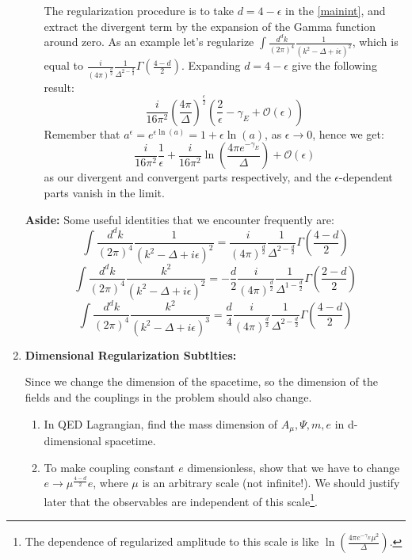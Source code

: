\documentclass[11pt]{article}
\begin{document}
\begin{enumerate}
\begin{problem}{\points{-}}
\begin{enumerate}
		The regularization procedure is to take $d = 4-\epsilon$ in the \eqref{mainint}, and extract the divergent term by the expansion of the Gamma function around zero. As an example let's regularize $\int \frac{d^dk}{(2\pi)^4} \frac{1}{(k^2-\Delta+i\epsilon)^2}$, which is equal to 
		$\frac{i}{(4\pi)^{\frac{d}{2}}} 
		\frac{1}{\Delta^{2-\frac{d}{2}}}\Gamma(\frac{4-d}{2}).
		$
		Expanding $d= 4 - \epsilon$ give the following result:
		\[
		\frac{i}{16\pi^2} (\frac{4\pi}{\Delta})^{\frac{\epsilon}{2}}(\frac{2}{\epsilon} - \gamma_E + \mathcal{O}(\epsilon))
		\]
		Remember that $a^\epsilon = e^{\epsilon \ln(a)} = 1+\epsilon \ln(a)$, as $\epsilon \to 0$, hence we get:
		\[
		\frac{i}{16\pi^2}\frac{1}{\epsilon} + 	\frac{i}{16\pi^2}\ln(\frac{4\pi e^{-\gamma_E}}{\Delta}) + \mathcal{O}(\epsilon)
		\] as our divergent and convergent parts respectively, and the $\epsilon$-dependent parts vanish in the limit.
		\end{enumerate}
	\textbf{Aside:} Some useful identities  that we encounter frequently are:
	\[
	\int\frac{d^dk}{(2\pi)^4} \frac{1}{(k^2-\Delta+i\epsilon)^2} = \frac{i}{(4\pi)^{\frac{d}{2}}}\frac{1}{\Delta^{2-\frac{d}{2}}}\Gamma(\frac{4-d}{2})
	\]
		\[
	\int\frac{d^dk}{(2\pi)^4} \frac{k^2}{(k^2-\Delta+i\epsilon)^2} = -\frac{d}{2}\frac{i}{(4\pi)^{\frac{d}{2}}}\frac{1}{\Delta^{1-\frac{d}{2}}}\Gamma(\frac{2-d}{2})
	\]
			\[
	\int\frac{d^dk}{(2\pi)^4} \frac{k^2}{(k^2-\Delta+i\epsilon)^3} = \frac{d}{4}\frac{i}{(4\pi)^{\frac{d}{2}}}\frac{1}{\Delta^{2-\frac{d}{2}}}\Gamma(\frac{4-d}{2})
	\]
	\end{problem}

	\item
\begin{problem}{\points{-}}
	\textbf{Dimensional Regularization Subtlties:}

	Since we change the dimension of the spacetime, so the dimension of the fields and the couplings in the problem should also change.
	\begin{enumerate}
		\item In QED Lagrangian, find the mass dimension of $A_\mu, \Psi, m, e$ in d-dimensional spacetime.
		\item To make coupling constant $e$ dimensionless, show that we have to change $e \to \mu^{\frac{4-d}{2}} e$, where $\mu$ is an arbitrary scale (not infinite!). We should justify later that the observables are independent of this scale\footnote{The dependence of regularized amplitude to this scale is like
	$\ln(\frac{4\pi e^{-\gamma_E}\mu^2}{\Delta})$.
	}.
	\end{enumerate}
\end{problem}

\end{enumerate}
\end{document}
